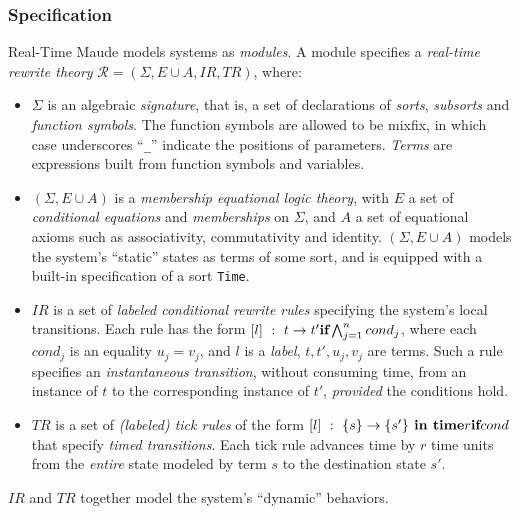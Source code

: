 \documentclass[journal]{IEEEtranTIE}
\begin{document}
\subsubsection{Specification}
Real-Time Maude models systems as \emph{modules}. A module specifies a
\emph{real-time rewrite theory} $\mathcal{R} = (\Sigma,
\mathit{E}\cup\mathit{A} , \mathit{IR}, \mathit{TR})$, where:
\begin{itemize}
\item $\Sigma$ is an algebraic \emph{signature}, that is, a set of
  declarations of \emph{sorts}, \emph{subsorts} and \emph{function
    symbols}. The function symbols are allowed to be mixfix, in which
  case underscores ``\verb|_|'' indicate the positions of parameters.
  \emph{Terms} are expressions built from function symbols and
  variables.
\item $(\Sigma, \mathit{E}\cup\mathit{A})$ is a \emph{membership
  equational logic theory}, with $\mathit{E}$ a set of
  \emph{conditional equations} and \emph{memberships} on $\Sigma$, and
  $\mathit{A}$ a set of equational axioms such as associativity,
  commutativity and identity.  $(\Sigma, \mathit{E}\cup\mathit{A})$
  models the system's ``static'' states as terms of some sort, and is
  equipped with a built-in specification of a sort \verb|Time|.
\item $\mathit{IR}$ is a set of \emph{labeled conditional rewrite
  rules} specifying the system's local transitions. Each rule has the
  form $[l]~:~t\rightarrow t'\mbox{ \textbf{if}
  }\bigwedge^n_{j=1}cond_j$, where each $cond_j$ is an equality
  $u_j=v_j$, and $l$ is a \emph{label}, $t,t',u_j,v_j$ are terms. Such
  a rule specifies an \emph{instantaneous transition}, without
  consuming time, from an instance of $t$ to the corresponding
  instance of $t'$, \emph{provided} the conditions hold.
\item $\mathit{TR}$ is a set of \emph{(labeled) tick rules} of
  the form $[l]~:~\{s\}\rightarrow\{s'\} \mbox{\textbf{ in time}
  }r\mbox{ \textbf{if} }cond$ that specify \emph{timed
    transitions}. Each tick rule advances time by $r$ time units from
  the \emph{entire} state modeled by term $s$ to the destination state
  $s'$.
\end{itemize}
$\mathit{IR}$ and $\mathit{TR}$ together model the system's ``dynamic''
behaviors.
\end{document}
